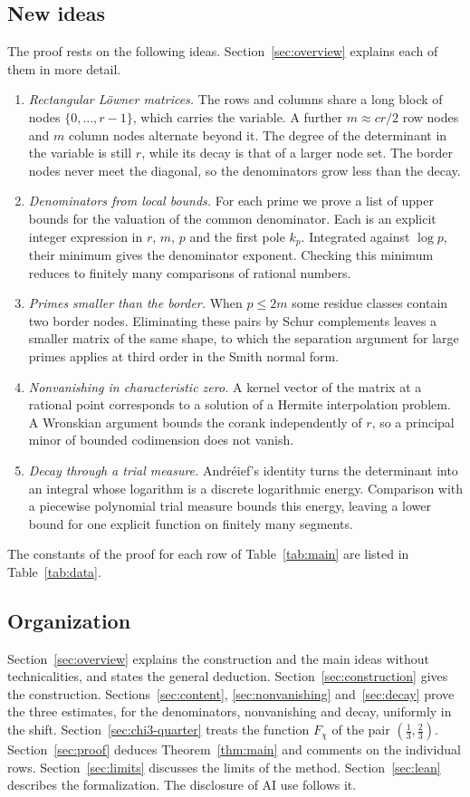 \documentclass[11pt]{amsart}
\theoremstyle{definition}
\theoremstyle{remark}
\numberwithin{equation}{section}
\begin{document}
\subsection{New ideas}
The proof rests on the following ideas. Section~\ref{sec:overview} explains each of them in more detail.
\begin{enumerate}[leftmargin=*]
\item \emph{Rectangular L\"owner matrices.} The rows and columns share a long block of nodes $\{0,\dots,r-1\}$, which
 carries the variable. A further $m\approx cr/2$ row nodes and $m$ column nodes alternate beyond it. The degree of the
 determinant in the variable is still $r$, while its decay is that of a larger node set. The border nodes never meet
 the diagonal, so the denominators grow less than the decay.
\item \emph{Denominators from local bounds.} For each prime we prove a list of upper bounds for the valuation of the
 common denominator. Each is an explicit integer expression in $r$, $m$, $p$ and the first pole $k_p$. Integrated
 against $\log p$, their minimum gives the denominator exponent. Checking this minimum reduces to finitely many
 comparisons of rational numbers.
\item \emph{Primes smaller than the border.} When $p\le2m$ some residue classes contain two border nodes. Eliminating
 these pairs by Schur complements leaves a smaller matrix of the same shape, to which the separation argument for large
 primes applies at third order in the Smith normal form.
\item \emph{Nonvanishing in characteristic zero.} A kernel vector of the matrix at a rational point corresponds to a
 solution of a Hermite interpolation problem. A Wronskian argument bounds the corank independently of $r$, so a
 principal minor of bounded codimension does not vanish.
\item \emph{Decay through a trial measure.} Andr\'eief's identity turns the determinant into an integral whose
 logarithm is a discrete logarithmic energy. Comparison with a piecewise polynomial trial measure bounds this energy,
 leaving a lower bound for one explicit function on finitely many segments.
\end{enumerate}
The constants of the proof for each row of Table~\ref{tab:main} are listed in Table~\ref{tab:data}.

\subsection{Organization}
Section~\ref{sec:overview} explains the construction and the main ideas without technicalities, and states the general
deduction. Section~\ref{sec:construction} gives the construction. Sections~\ref{sec:content}, \ref{sec:nonvanishing}
and~\ref{sec:decay} prove the three estimates, for the denominators, nonvanishing and decay, uniformly in the shift.
Section~\ref{sec:chi3-quarter} treats the function $F_\chi$ of the pair $(\frac13,\frac23)$. Section~\ref{sec:proof} deduces
Theorem~\ref{thm:main} and comments on the individual rows. Section~\ref{sec:limits} discusses the limits of the method. Section~\ref{sec:lean} describes the formalization. The
disclosure of AI use follows it.
\end{document}
